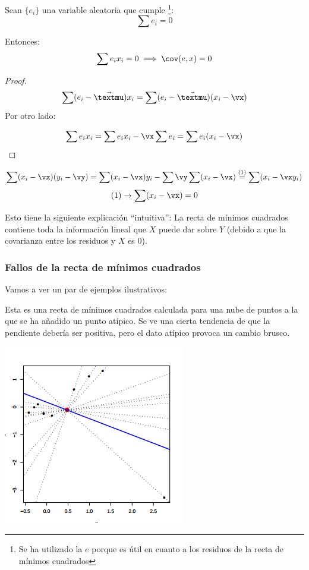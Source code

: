 \begin{prop}
Sean $\{e_i\}$ una variable aleatoria que cumple \footnote{Se ha utilizado la $e$ porque es útil en cuanto a los residuos de la recta de mínimos cuadrados}:
\[\sum e_i = 0\]

Entonces:
\[\sum e_i x_i = 0 \implies \cov(e,x) = 0\]
\end{prop}

\begin{proof}
\[\sum (e_i - \vec{µ}) x_i = \sum (e_i - \vec{µ}) (x_i - \vx) \]
Por otro lado:

\[
\sum e_ix_i = \sum e_ix_i - \vx \sum e_i = \sum e_i(x_i - \vx)
\]
\end{proof}


\begin{example}
\[
\sum (x_i - \vx)(y_i -\vy) = \sum (x_i - \vx)y_i - \sum \vy\sum(x_i - \vx) \overset{(1)}{=} \sum(x_i - \vx y_i)
\]
\[
(1) \to \sum(x_i - \vx) = 0
\]
\end{example}

Esto tiene la siguiente explicación ``intuitiva'': La recta de mínimos cuadrados contiene toda la información lineal que $X$ puede dar sobre $Y$ (debido a que la covarianza entre los residuos y $X$ es 0).


\subsubsection{Fallos de la recta de mínimos cuadrados}

Vamos a ver un par de ejemplos ilustrativos:

\begin{example}

Esta es una recta de mínimos cuadrados calculada para una nube de puntos a la que se ha añadido un punto atípico. Se ve una cierta tendencia de que la pendiente debería ser positiva, pero el dato atípico provoca un cambio brusco.
\begin{center}
\includegraphics[scale=0.9]{img/rmc_atipico2.png}
\end{center}

\end{example}

